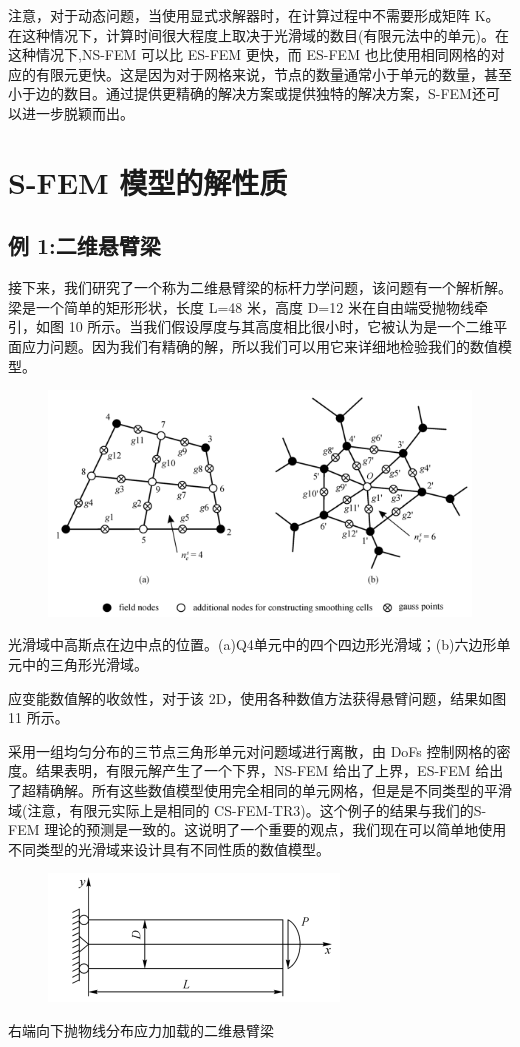 \documentclass[12pt,a4paper]{article}
\begin{document}
注意，对于动态问题，当使用显式求解器时，在计算过程中不需要形成矩阵 K。在这种情况下，计算时间很大程度上取决于光滑域的数目(有限元法中的单元)。在这种情况下,NS-FEM 可以比 ES-FEM 更快，而 ES-FEM 也比使用相同网格的对应的有限元更快。这是因为对于网格来说，节点的数量通常小于单元的数量，甚至小于边的数目。通过提供更精确的解决方案或提供独特的解决方案，S-FEM还可以进一步脱颖而出。

\section{S-FEM 模型的解性质}
\subsection{例 1:二维悬臂梁}
接下来，我们研究了一个称为二维悬臂梁的标杆力学问题，该问题有一个解析解。梁是一个简单的矩形形状，长度 L=48 米，高度 D=12 米在自由端受抛物线牵引，如图 10 所示。当我们假设厚度与其高度相比很小时，它被认为是一个二维平面应力问题。因为我们有精确的解，所以我们可以用它来详细地检验我们的数值模型。

\begin{figure}[H]
\centering
\includegraphics[scale=0.6]{./figures/13.png}
\caption{}
\end{figure}

光滑域中高斯点在边中点的位置。(a)Q4单元中的四个四边形光滑域；(b)六边形单元中的三角形光滑域。

应变能数值解的收敛性，对于该 2D，使用各种数值方法获得悬臂问题，结果如图11 所示。

采用一组均匀分布的三节点三角形单元对问题域进行离散，由 DoFs 控制网格的密度。结果表明，有限元解产生了一个下界，NS-FEM 给出了上界，ES-FEM 给出了超精确解。所有这些数值模型使用完全相同的单元网格，但是是不同类型的平滑域(注意，有限元实际上是相同的 CS-FEM-TR3)。这个例子的结果与我们的S-FEM 理论的预测是一致的。这说明了一个重要的观点，我们现在可以简单地使用不同类型的光滑域来设计具有不同性质的数值模型。
\begin{figure}[H]
\centering
\includegraphics[scale=0.5]{./figures/14.png}
\caption{}
\end{figure}
右端向下抛物线分布应力加载的二维悬臂梁
\end{document}
